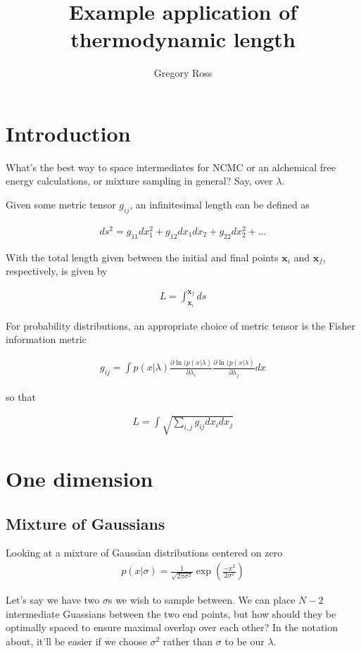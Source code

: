 \documentclass[10pt,a4paper]{article}
\author{Gregory Ross}
\title{Example application of thermodynamic length}
\begin{document}
\section{Introduction}
What's the best way to space intermediates for NCMC or an alchemical free energy calculations, or mixture sampling in general? Say, over $\lambda$.

Given some metric tensor $g_{ij}$, an infinitesimal length can be defined as 

\begin{align}
ds^2 = g_{11} dx_1^2 + g_{12} dx_1 dx_2 + g_{22} dx_2^2 + ...
\end{align}

With the total length given between the initial and final points $\mathbf{x}_i$ and $\mathbf{x}_f$, respectively, is given by

\begin{align}
L = \int_{\mathbf{x}_i}^{\mathbf{x}_f} ds
\end{align}

For probability distributions, an appropriate choice of metric tensor is the Fisher information metric

\begin{align}
g_{ij} = \int p(x|\lambda) \frac{\partial \ln (p(x|\lambda)}{\partial \lambda_i}\frac{\partial \ln (p(x|\lambda)}{\partial \lambda_j} dx
\end{align}

so that

\begin{align}
L = \int \sqrt{\sum_{i,j} g_{ij}dx_i dx_j}
\end{align}

\section{One dimension}
\subsection{Mixture of Gaussians}
Looking at a mixture of Gaussian distributions centered on zero
\begin{align}
p(x|\sigma) = \frac{1}{\sqrt{2\pi\sigma^2}} \exp\left(\frac{-x^2}{2\sigma^2}\right)
\end{align}

Let's say we have two $\sigma$s we wish to sample between. We can place $N-2$ intermediate Guassians between the two end points, but how should they be optimally spaced to ensure maximal overlap over each other? In the notation about, it'll be easier if we choose $\sigma^2$ rather than $\sigma$ to be our $\lambda$.
\end{document}
